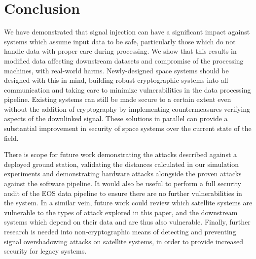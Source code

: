 \section{Conclusion}


We have demonstrated that signal injection can have a significant impact against systems which assume input data to be safe, particularly those which do not handle data with proper care during processing.
We show that this results in modified data affecting downstream datasets and compromise of the processing machines, with real-world harms. %
Newly-designed space systems should be designed with this in mind, building robust cryptographic systems into all communication and taking care to minimize vulnerabilities in the data processing pipeline.
Existing systems can still be made secure to a certain extent even without the addition of cryptography by implementing countermeasures verifying aspects of the downlinked signal.
These solutions in parallel can provide a substantial improvement in security of space systems over the current state of the field.

There is scope for future work demonstrating the attacks described against a deployed ground station, validating the distances calculated in our simulation experiments and demonstrating hardware attacks alongside the proven attacks against the software pipeline.
It would also be useful to perform a full security audit of the EOS data pipeline to ensure there are no further vulnerabilities in the system.
In a similar vein, future work could review which satellite systems are vulnerable to the types of attack explored in this paper, and the downstream systems which depend on their data and are thus also vulnerable.
Finally, further research is needed into non-cryptographic means of detecting and preventing signal overshadowing attacks on satellite systems, in order to provide increased security for legacy systems.
